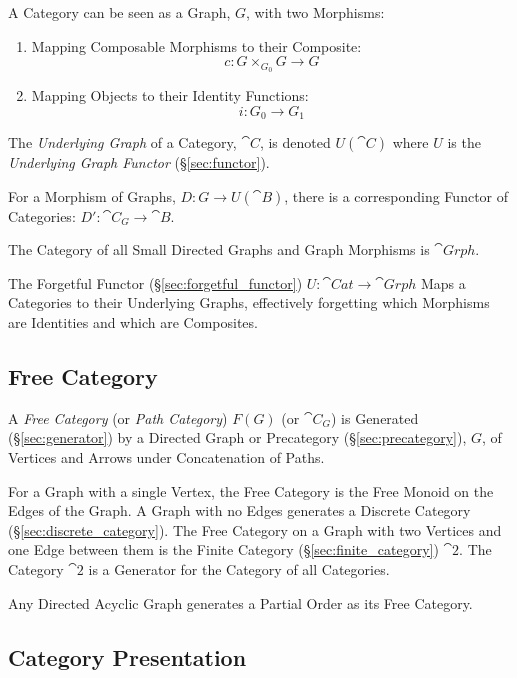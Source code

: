 A Category can be seen as a Graph, $G$, with two Morphisms:
\begin{enumerate}
  \item Mapping Composable Morphisms to their Composite:
    \[c : G \times_{G_0} G \rightarrow G\]
  \item Mapping Objects to their Identity Functions:
    \[i: G_0 \rightarrow G_1\]
\end{enumerate}
The \emph{Underlying Graph} of a Category, $\cat{C}$, is denoted
$U(\cat{C})$ where $U$ is the \emph{Underlying Graph Functor}
(\S\ref{sec:functor}).

For a Morphism of Graphs, $D : G \rightarrow U(\cat{B})$, there is
a corresponding Functor of Categories: $D' : \cat{C}_G \rightarrow
\cat{B}$.

The Category of all Small Directed Graphs and Graph Morphisms is
$\cat{Grph}$.

The Forgetful Functor (\S\ref{sec:forgetful_functor}) $U : \cat{Cat}
\rightarrow \cat{Grph}$ Maps a Categories to their Underlying Graphs,
effectively forgetting which Morphisms are Identities and which are
Composites.



\subsection{Free Category}\label{sec:free_category}

A \emph{Free Category} (or \emph{Path Category}) $F(G)$ (or
$\cat{C}_G$) is Generated (\S\ref{sec:generator}) by a Directed Graph
or Precategory (\S\ref{sec:precategory}), $G$, of Vertices and Arrows
under Concatenation of Paths.

For a Graph with a single Vertex, the Free Category is the Free Monoid
on the Edges of the Graph. A Graph with no Edges generates a Discrete
Category (\S\ref{sec:discrete_category}). The Free Category on a Graph
with two Vertices and one Edge between them is the Finite Category
(\S\ref{sec:finite_category}) $\cat{2}$. The Category $\cat{2}$ is a
Generator for the Category of all Categories.

Any Directed Acyclic Graph generates a Partial Order as its Free
Category.



\subsection{Category Presentation}\label{sec:category_presentation}


